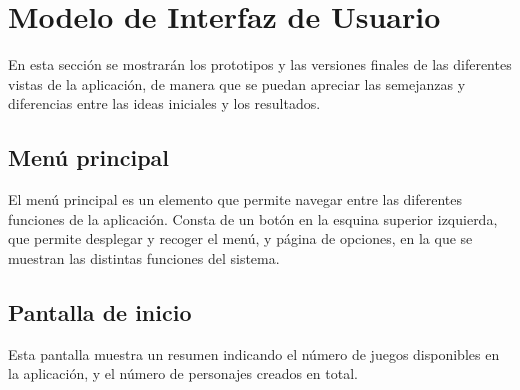 
\section{Modelo de Interfaz de Usuario}
En esta sección se mostrarán los prototipos y las versiones finales de las diferentes vistas de la aplicación, de manera 
que se puedan apreciar las semejanzas y diferencias entre las ideas iniciales y los resultados.

\subsection{Menú principal}
El menú principal es un elemento que permite navegar entre las diferentes funciones de la aplicación. Consta de 
un botón en la esquina superior izquierda, que permite desplegar y recoger el menú, y página de opciones, 
en la que se muestran las distintas funciones del sistema. 

\subsection{Pantalla de inicio}
Esta pantalla muestra un resumen indicando el número de juegos disponibles en la aplicación, 
y el número de personajes creados en total. 



